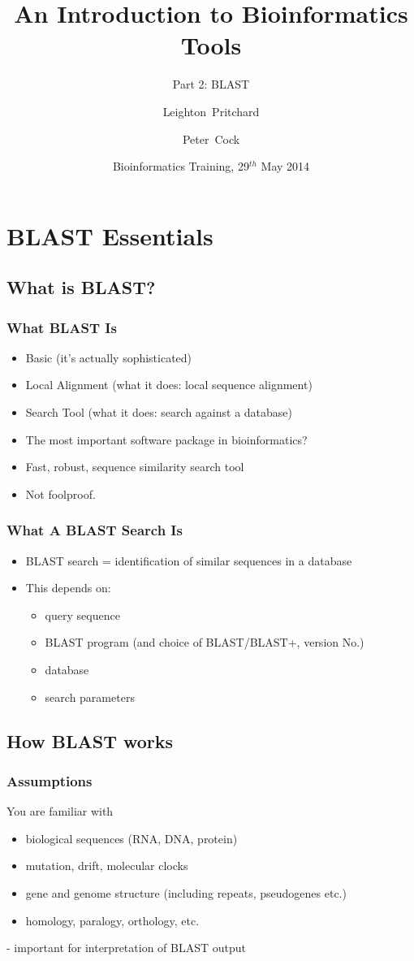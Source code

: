 \documentclass[table]{beamer}
\title[Intro to Bioinformatics] %
{An Introduction to Bioinformatics Tools}
\subtitle{Part 2: BLAST}
\author[Pritchard, Cock] %
{Leighton~Pritchard \and Peter~Cock}
\institute[The James Hutton Institute] %
{
  Information and Computational Sciences\\
  The James Hutton Institute
}
\date[May 2014] %
{Bioinformatics Training, 29$^{th}$ May 2014}
\begin{document}
  \frame[plain]{\titlepage}
  
  \section{BLAST Essentials}
  
    \subsection{What is BLAST?}
    \begin{frame}
     \frametitle{What BLAST Is}
     \begin{itemize}
       \item Basic (it's actually sophisticated)
       \item Local Alignment (what it does: local sequence alignment)
       \item Search Tool (what it does: search against a database)
       \item The most important software package in bioinformatics?
       \item Fast, robust, sequence similarity search tool
       \item Not foolproof.
     \end{itemize}
    \end{frame}
  
    \begin{frame}
     \frametitle{What A BLAST Search Is}
     \begin{itemize}
       \item BLAST search = identification of similar sequences in a database
       \item This depends on:
       \begin{itemize}
         \item query sequence
         \item BLAST program (and choice of BLAST/BLAST+, version No.)
         \item database
         \item search parameters
       \end{itemize}
     \end{itemize}
    \end{frame}  
  
    \subsection{How BLAST works}
    \begin{frame}
     \frametitle{Assumptions}
     You are familiar with
     \begin{itemize}
       \item biological sequences (RNA, DNA, protein)
       \item mutation, drift, molecular clocks
       \item gene and genome structure (including repeats, pseudogenes etc.)
       \item homology, paralogy, orthology, etc.
     \end{itemize}
     - important for interpretation of BLAST output
    \end{frame}
    
\end{document}
